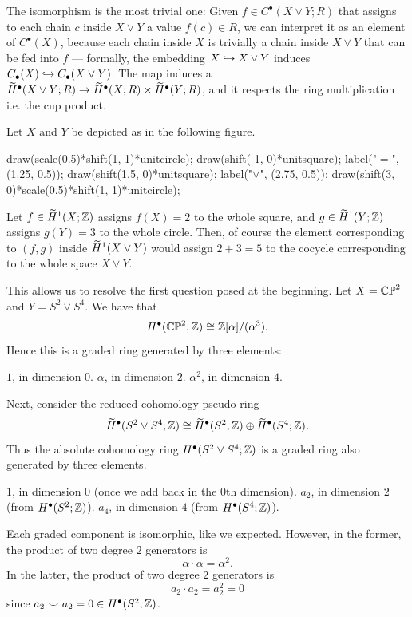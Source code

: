 The isomorphism is the most trivial one:
Given $f \in C^\bullet(X \vee Y; R)$ that assigns to each chain $c$ inside $X \vee Y$ a value
$f(c) \in R$, we can interpret it as an element of $C^\bullet(X)$, because each chain inside $X$ is
trivially a chain inside $X \vee Y$ that can be fed into $f$ ---
formally, the embedding $X \hookrightarrow X \vee Y$ induces
$C_\bullet(X) \hookrightarrow C_\bullet(X \vee Y)$. The map induces a $\widetilde H^\bullet(X \vee Y; R)
\to \widetilde H^\bullet(X; R) \times \widetilde H^\bullet(Y; R)$, and it respects the ring multiplication i.e.
the cup product.

\begin{example}
	Let $X$ and $Y$ be depicted as in the following figure.
	\begin{center}
	\begin{asy}
		draw(scale(0.5)*shift(1, 1)*unitcircle);
		draw(shift(-1, 0)*unitsquare);
		label("$=$", (1.25, 0.5));
		draw(shift(1.5, 0)*unitsquare);
		label("$\vee$", (2.75, 0.5));
		draw(shift(3, 0)*scale(0.5)*shift(1, 1)*unitcircle);
	\end{asy}
	\end{center}
	Let $f \in \widetilde H^1(X; \mathbb Z)$ assigns $f(X) = 2$ to the whole square, and
	$g \in \widetilde H^1(Y; \mathbb Z)$ assigns $g(Y) = 3$ to the whole circle.
	Then, of course the element corresponding to $(f, g)$ inside $\widetilde H^1(X \vee Y)$ would assign
	$2 + 3 = 5$ to the cocycle corresponding to the whole space $X \vee Y$.
\end{example}

This allows us to resolve the first question posed at the beginning.
Let $X = \mathbb{CP}^2$ and $Y = S^2 \vee S^4$.
We have that
\[ H^\bullet(\mathbb{CP}^2; \mathbb Z) \cong \mathbb Z[\alpha] / (\alpha^3). \]
Hence this is a graded ring generated by three elements:
\begin{itemize}
	\ii $1$, in dimension $0$.
	\ii $\alpha$, in dimension $2$.
	\ii $\alpha^2$, in dimension $4$.
\end{itemize}
Next, consider the reduced cohomology pseudo-ring
\[ \widetilde H^\bullet(S^2 \vee S^4; \mathbb Z) \cong
	\widetilde H^\bullet(S^2; \mathbb Z)
	\oplus \widetilde H^\bullet(S^4 ; \mathbb Z).
\]
Thus the absolute cohomology ring $H^\bullet(S^2 \vee S^4 ; \mathbb Z)$
is a graded ring also generated by three elements.
\begin{itemize}
	\ii $1$, in dimension $0$ (once we add back in the $0$th dimension).
	\ii $a_2$, in dimension $2$ (from $H^\bullet(S^2 ; \mathbb Z)$).
	\ii $a_4$, in dimension $4$ (from $H^\bullet(S^4 ; \mathbb Z)$).
\end{itemize}
Each graded component is isomorphic, like we expected.
However, in the former, the product of two degree $2$ generators is
\[ \alpha \cdot \alpha = \alpha^2. \]
In the latter, the product of two degree $2$ generators is
\[ a_2 \cdot a_2 = a_2^2 = 0 \]
since $a_2 \smile a_2 = 0 \in H^\bullet(S^2; \mathbb Z)$.

